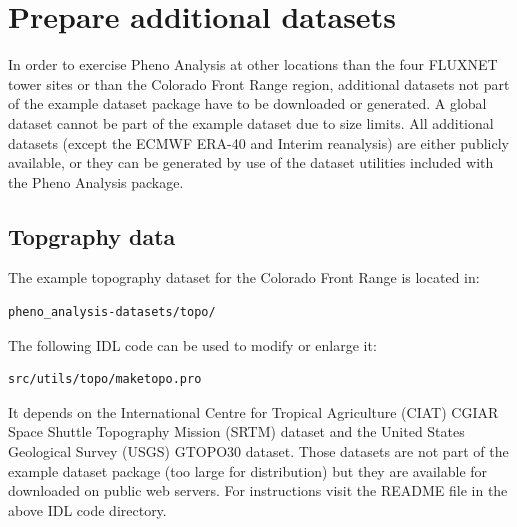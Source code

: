 \documentclass[a4paper,12pt]{article}
\begin{document}
\section{Prepare additional datasets}
In order to exercise Pheno Analysis at other locations than the four FLUXNET tower sites or than the Colorado Front Range region, additional datasets not part of the example dataset package have to be downloaded or generated. A global dataset cannot be part of the example dataset due to size limits. All additional datasets (except the ECMWF ERA-40 and Interim reanalysis) are either publicly available, or they can be generated by use of the dataset utilities included with the Pheno Analysis package.

\subsection{Topgraphy data}
The example topography dataset for the Colorado Front Range is located in:
\begin{verbatim}
pheno_analysis-datasets/topo/
\end{verbatim}
The following IDL code can be used to modify or enlarge it:
\begin{verbatim}
src/utils/topo/maketopo.pro
\end{verbatim}
It depends on the International  Centre for Tropical  Agriculture (CIAT) CGIAR Space Shuttle Topography Mission (SRTM) dataset \citep{CGIAR-SRTM} and the United States Geological Survey (USGS) GTOPO30  \citep{GTOPO1996} dataset. Those datasets are not part of the example dataset package (too large for distribution) but they are available for downloaded on public web servers. For instructions visit the README file in the above IDL code directory.
\end{document}
